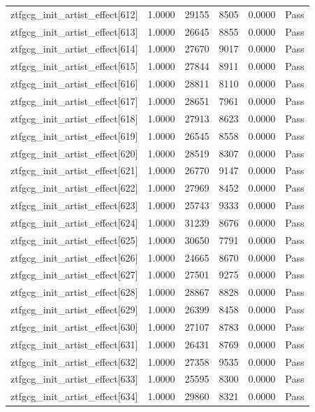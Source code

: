 \begin{table}[htbp]
\begin{tabular}{llrrll}
ztfgcg\_init\_artist\_effect[612] & 1.0000 & 29155 & 8505 & 0.0000 & Pass \\
ztfgcg\_init\_artist\_effect[613] & 1.0000 & 26645 & 8855 & 0.0000 & Pass \\
ztfgcg\_init\_artist\_effect[614] & 1.0000 & 27670 & 9017 & 0.0000 & Pass \\
ztfgcg\_init\_artist\_effect[615] & 1.0000 & 27844 & 8911 & 0.0000 & Pass \\
ztfgcg\_init\_artist\_effect[616] & 1.0000 & 28811 & 8110 & 0.0000 & Pass \\
ztfgcg\_init\_artist\_effect[617] & 1.0000 & 28651 & 7961 & 0.0000 & Pass \\
ztfgcg\_init\_artist\_effect[618] & 1.0000 & 27913 & 8623 & 0.0000 & Pass \\
ztfgcg\_init\_artist\_effect[619] & 1.0000 & 26545 & 8558 & 0.0000 & Pass \\
ztfgcg\_init\_artist\_effect[620] & 1.0000 & 28519 & 8307 & 0.0000 & Pass \\
ztfgcg\_init\_artist\_effect[621] & 1.0000 & 26770 & 9147 & 0.0000 & Pass \\
ztfgcg\_init\_artist\_effect[622] & 1.0000 & 27969 & 8452 & 0.0000 & Pass \\
ztfgcg\_init\_artist\_effect[623] & 1.0000 & 25743 & 9333 & 0.0000 & Pass \\
ztfgcg\_init\_artist\_effect[624] & 1.0000 & 31239 & 8676 & 0.0000 & Pass \\
ztfgcg\_init\_artist\_effect[625] & 1.0000 & 30650 & 7791 & 0.0000 & Pass \\
ztfgcg\_init\_artist\_effect[626] & 1.0000 & 24665 & 8670 & 0.0000 & Pass \\
ztfgcg\_init\_artist\_effect[627] & 1.0000 & 27501 & 9275 & 0.0000 & Pass \\
ztfgcg\_init\_artist\_effect[628] & 1.0000 & 28867 & 8828 & 0.0000 & Pass \\
ztfgcg\_init\_artist\_effect[629] & 1.0000 & 26399 & 8458 & 0.0000 & Pass \\
ztfgcg\_init\_artist\_effect[630] & 1.0000 & 27107 & 8783 & 0.0000 & Pass \\
ztfgcg\_init\_artist\_effect[631] & 1.0000 & 26431 & 8769 & 0.0000 & Pass \\
ztfgcg\_init\_artist\_effect[632] & 1.0000 & 27358 & 9535 & 0.0000 & Pass \\
ztfgcg\_init\_artist\_effect[633] & 1.0000 & 25595 & 8300 & 0.0000 & Pass \\
ztfgcg\_init\_artist\_effect[634] & 1.0000 & 29860 & 8321 & 0.0000 & Pass \\

\end{tabular}
\end{table}
